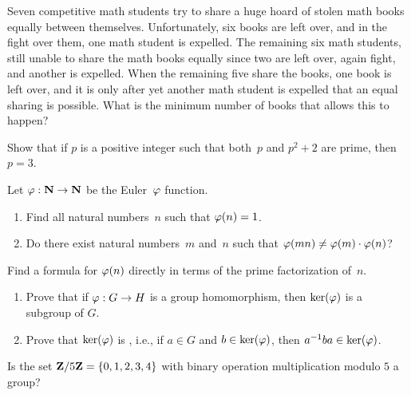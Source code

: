 \begin{exercises}
\item\label{ex:thieves} Seven competitive math students try to
  share a huge hoard of stolen math books equally between themselves.
  Unfortunately, six books are left over, and in the fight over them,
  one math student is expelled.  The remaining six math students,
  still unable to share the math books equally since two are left
  over, again fight, and another is expelled.  When the remaining five
  share the books, one book is left over, and it is only after yet
  another math student is expelled that an equal sharing is possible.
  What is the minimum number of books that allows this to happen?



\item\label{ex:pcube} Show that if $p$ is a positive integer such that both~$p$
and $p^2+2$ are prime, then $p=3$.


\item\label{ex:phimult} Let $\varphi:\mathbf{N}\rightarrow\mathbf{N}$ be the
Euler~$\varphi$ function.
\begin{enumerate}
   \item Find all natural numbers~$n$ such that $\varphi(n)=1$.
   \item Do there exist natural numbers~$m$ and~$n$ such that
     $\varphi(mn)\neq \varphi(m)\cdot \varphi(n)$?
      \end{enumerate}

\item\label{ex:phiformula} Find a formula for $\varphi(n)$ directly in terms
of the prime factorization of~$n$.

\item\label{ex:ker}
\begin{enumerate}
\item Prove that if $\varphi:G\to H$ is a group
  homomorphism, then $\ker(\varphi)$ is a subgroup of $G$.
\item Prove that $\ker(\varphi)$ is , i.e.,
if $a\in G$ and $b\in\ker(\varphi)$, then $a^{-1} b a \in \ker(\varphi)$.
\end{enumerate}

\item Is the set $\mathbf{Z}/5\mathbf{Z}=\{0,1,2,3,4\}$ with binary operation
multiplication modulo $5$ a group?


\end{exercises}
